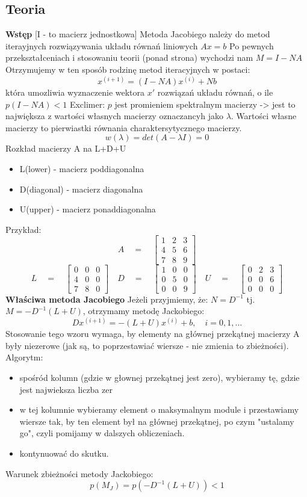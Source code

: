 \documentclass[a4paper]{article}
\begin{document}
\subsection{Teoria}
\textbf{Wstęp}
[I - to macierz jednostkowa]\newline
Metoda Jacobiego należy do metod iterayjnych rozwiązywania układu równań liniowych $Ax = b$ Po pewnych przekształceniach i stosowaniu teorii (ponad strona) wychodzi nam $M = I - NA$ Otrzymujemy w ten sposób rodzinę metod iteracyjnych w postaci:
$$ x^{(i+1)} = (I-NA)x^{(i)} + Nb $$
która umozliwia wyznaczenie wektora $x'$ rozwiązań układu równań, o ile $p(I-NA)<1$
\newline Exclimer: $p$ jest promieniem spektralnym macierzy -> jest to największa z wartości własnych macierzy oznaczancyh jako $\lambda$. Wartości własne macierzy to pierwiastki równania charaktersytycznego macierzy. 
$$w(\lambda) = det(A-\lambda I) = 0$$
Rozkład macierzy A na L+D+U
\begin{itemize}
    \item L(lower) - macierz poddiagonalna
    \item D(diagonal) - macierz diagonalna
    \item U(upper) - macierz ponaddiagonalna
\end{itemize}
Przykład:
$$ A \quad = \quad 
\begin{bmatrix}
1 & 2 & 3 \\
4 & 5 & 6 \\
7 & 8 & 9
\end{bmatrix}
$$
$$ L \quad = \quad 
\begin{bmatrix}
0 & 0 & 0 \\
4 & 0 & 0 \\
7 & 8 & 0
\end{bmatrix} \quad
D \quad = \quad 
\begin{bmatrix}
1 & 0 & 0 \\
0 & 5 & 0 \\
0 & 0 & 9
\end{bmatrix} \quad
U \quad = \quad 
\begin{bmatrix}
0 & 2 & 3 \\
0 & 0 & 6 \\
0 & 0 & 0
\end{bmatrix}
$$
\textbf{Właściwa metoda Jacobiego}\newline
Jeżeli przyjmiemy, że: $N = D^{-1}$ tj. $M = -D^{-1}(L+U)$, otrzymamy metodę Jackobiego:
$$ Dx^{(i+1)} = -(L+U)x^{(i)} + b, \quad i = 0, 1, ...$$
Stosowanie tego wzoru wymaga, by elementy na głównej przekątnej macierzy A były niezerowe (jak są, to poprzestawiać wiersze - nie zmienia to zbieżności).
Algorytm:
\begin{itemize}
    \item spośród kolumn (gdzie w głownej przekątnej jest zero), wybieramy tę, gdzie jest najwieksza liczba zer
    \item w tej kolumnie wybieramy element o maksymalnym module i przestawiamy wiersze tak, by ten element był na głównej przekątnej, po czym "ustalamy go", czyli pomijamy w dalszych obliczeniach.
    \item kontynuować do skutku.
\end{itemize}
Warunek zbieżności metody Jackobiego:
$$ p(M_J)=p(-D^{-1}(L+U))<1 $$
\end{document}
